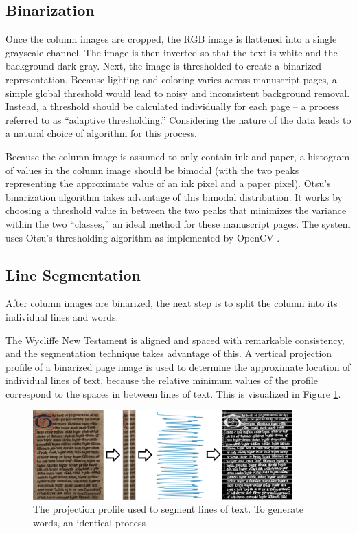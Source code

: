 \documentclass[final]{ukthesis}
\begin{document}
\subsection{Binarization}
Once the column images are cropped, the RGB image is flattened into a single grayscale channel. The image is then inverted so that the text is white and the background dark gray. Next, the image is thresholded to create a binarized representation. Because lighting and coloring varies across manuscript pages, a simple global threshold would lead to noisy and inconsistent background removal. Instead, a threshold should be calculated individually for each page -- a process referred to as ``adaptive thresholding.'' Considering the nature of the data leads to a natural choice of algorithm for this process.

Because the column image is assumed to only contain ink and paper, a histogram of values in the column image should be bimodal (with the two peaks representing the approximate value of an ink pixel and a paper pixel). Otsu's binarization algorithm  \cite{otsu1979threshold} takes advantage of this bimodal distribution. It works by choosing a threshold value in between the two peaks that minimizes the variance within the two ``classes,'' an ideal method for these manuscript pages. The system uses Otsu's thresholding algorithm as implemented by OpenCV \cite{bradski2000opencv}.


\subsection{Line Segmentation}
After column images are binarized, the next step is to split the column into its individual lines and words.

The Wycliffe New Testament is aligned and spaced with remarkable consistency, and the segmentation technique takes advantage of this. A vertical projection profile of a binarized page image is used to determine the approximate location of individual lines of text, because the relative minimum values of the profile correspond to the spaces in between lines of text. This is visualized in Figure \ref{fig:projection-profile-lines}.

\begin{figure}[h]
\begin{center}
\includegraphics[width=10cm]{projection-profile-lines}
\end{center}
\caption{The projection profile used to segment lines of text. To generate words, an identical process}
\label{fig:projection-profile-lines}
\end{figure}
\end{document}
